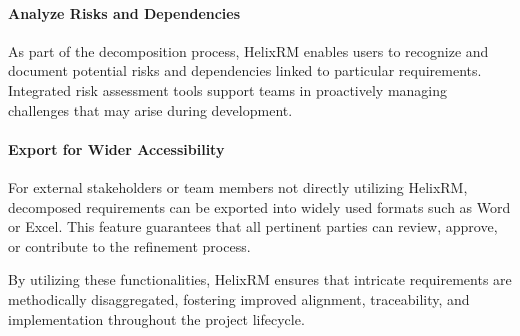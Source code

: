 \paragraph{Analyze Risks and Dependencies}
As part of the decomposition process, HelixRM enables users to recognize and document potential risks and dependencies linked to particular requirements. Integrated risk assessment tools support teams in proactively managing challenges that may arise during development.

\paragraph{Export for Wider Accessibility}
For external stakeholders or team members not directly utilizing HelixRM, decomposed requirements can be exported into widely used formats such as Word or Excel. This feature guarantees that all pertinent parties can review, approve, or contribute to the refinement process.

By utilizing these functionalities, HelixRM ensures that intricate requirements are methodically disaggregated, fostering improved alignment, traceability, and implementation throughout the project lifecycle.
